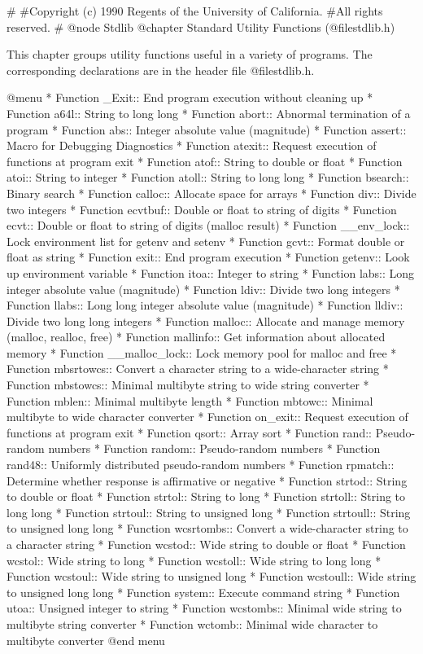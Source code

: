 #
#Copyright (c) 1990 Regents of the University of California.
#All rights reserved.
#
@node Stdlib
@chapter Standard Utility Functions (@file{stdlib.h})

This chapter groups utility functions useful in a variety of programs.
The corresponding declarations are in the header file @file{stdlib.h}.

@menu 
* Function _Exit::       End program execution without cleaning up
* Function a64l::        String to long long
* Function abort::       Abnormal termination of a program
* Function abs::         Integer absolute value (magnitude)
* Function assert::      Macro for Debugging Diagnostics
* Function atexit::      Request execution of functions at program exit
* Function atof::        String to double or float
* Function atoi::        String to integer
* Function atoll::       String to long long
* Function bsearch::     Binary search
* Function calloc::      Allocate space for arrays
* Function div::         Divide two integers
* Function ecvtbuf::     Double or float to string of digits
* Function ecvt::        Double or float to string of digits (malloc result)
* Function __env_lock::  Lock environment list for getenv and setenv
* Function gcvt::        Format double or float as string
* Function exit::        End program execution
* Function getenv::      Look up environment variable
* Function itoa::        Integer to string
* Function labs::        Long integer absolute value (magnitude)
* Function ldiv::        Divide two long integers
* Function llabs::       Long long integer absolute value (magnitude)
* Function lldiv::       Divide two long long integers
* Function malloc::      Allocate and manage memory (malloc, realloc, free)
* Function mallinfo::    Get information about allocated memory
* Function __malloc_lock::	Lock memory pool for malloc and free
* Function mbsrtowcs::   Convert a character string to a wide-character string
* Function mbstowcs::    Minimal multibyte string to wide string converter
* Function mblen::       Minimal multibyte length
* Function mbtowc::      Minimal multibyte to wide character converter
* Function on_exit::     Request execution of functions at program exit
* Function qsort::       Array sort
* Function rand::        Pseudo-random numbers
* Function random::      Pseudo-random numbers
* Function rand48::      Uniformly distributed pseudo-random numbers
* Function rpmatch::     Determine whether response is affirmative or negative
* Function strtod::      String to double or float
* Function strtol::      String to long
* Function strtoll::     String to long long
* Function strtoul::     String to unsigned long
* Function strtoull::    String to unsigned long long
* Function wcsrtombs::   Convert a wide-character string to a character string
* Function wcstod::      Wide string to double or float
* Function wcstol::      Wide string to long
* Function wcstoll::     Wide string to long long
* Function wcstoul::     Wide string to unsigned long
* Function wcstoull::    Wide string to unsigned long long
* Function system::      Execute command string
* Function utoa::        Unsigned integer to string
* Function wcstombs::    Minimal wide string to multibyte string converter
* Function wctomb::      Minimal wide character to multibyte converter
@end menu

